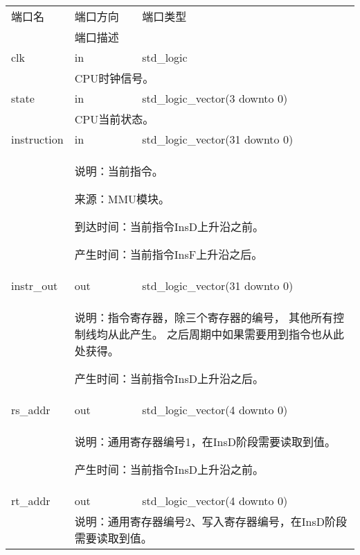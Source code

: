         \begin{tabularx}{\textwidth}{lll}
            \toprule
            端口名          & 端口方向  & 端口类型 \\
            \cmidrule(l){2-3}
            &
            \multicolumn{2}{X}{端口描述} \\
            \midrule
            clk             & in        & std\_logic \\
            \cmidrule(l){2-3}
            &
            \multicolumn{2}{X}{
                CPU时钟信号。
            } \\
            \midrule
            state           & in        & std\_logic\_vector(3 downto 0) \\
            \cmidrule(l){2-3}
            &
            \multicolumn{2}{X}{
                CPU当前状态。
            } \\
            \midrule
            instruction     & in        & std\_logic\_vector(31 downto 0) \\
            \cmidrule(l){2-3}
            &
            \multicolumn{2}{X}{
                说明：当前指令。

                来源：MMU模块。

                到达时间：当前指令InsD上升沿之前。

                产生时间：当前指令InsF上升沿之后。
            } \\
            \midrule
            instr\_out      & out       & std\_logic\_vector(31 downto 0) \\
            \cmidrule(l){2-3}
            &
            \multicolumn{2}{X}{
                说明：指令寄存器，除三个寄存器的编号，%
                其他所有控制线均从此产生。%
                之后周期中如果需要用到指令也从此处获得。

                产生时间：当前指令InsD上升沿之后。
            } \\
            \midrule
            rs\_addr        & out       & std\_logic\_vector(4 downto 0) \\
            \cmidrule(l){2-3}
            &
            \multicolumn{2}{X}{
                说明：通用寄存器编号1，在InsD阶段需要读取到值。

                产生时间：当前指令InsD上升沿之前。
            } \\
            \midrule
            rt\_addr        & out       & std\_logic\_vector(4 downto 0) \\
            \cmidrule(l){2-3}
            &
            \multicolumn{2}{X}{
                说明：通用寄存器编号2、写入寄存器编号，在InsD阶段需要读取到值。

}
\end{tabularx}
